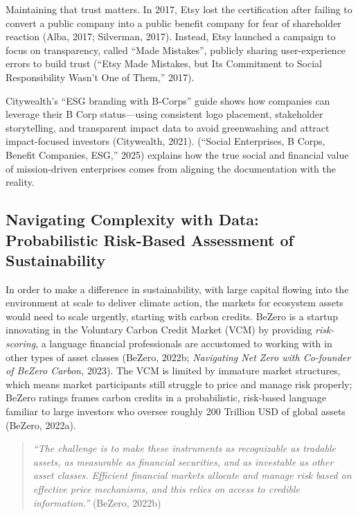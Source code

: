 \documentclass[
  12pt,
  letterpaper,
  DIV=11,
  numbers=noendperiod]{scrartcl}
\begin{document}
Maintaining that trust matters. In 2017, Etsy lost the certification
after failing to convert a public company into a public benefit company
for fear of shareholder reaction (Alba, 2017; Silverman, 2017). Instead,
Etsy launched a campaign to focus on transparency, called ``Made
Mistakes'', publicly sharing user-experience errors to build trust
({``Etsy Made Mistakes, but Its Commitment to Social Responsibility
Wasn't One of Them,''} 2017).

Citywealth's ``ESG branding with B-Corps'' guide shows how companies can
leverage their B Corp status---using consistent logo placement,
stakeholder storytelling, and transparent impact data to avoid
greenwashing and attract impact-focused investors (Citywealth, 2021).
({``Social {Enterprises}, {B Corps}, {Benefit Companies}, {ESG},''}
2025) explains how the true social and financial value of mission-driven
enterprises comes from aligning the documentation with the reality.

\subsection{Navigating Complexity with Data: Probabilistic Risk-Based
Assessment of
Sustainability}\label{navigating-complexity-with-data-probabilistic-risk-based-assessment-of-sustainability}

In order to make a difference in sustainability, with large capital
flowing into the environment at scale to deliver climate action, the
markets for ecosystem assets would need to scale urgently, starting with
carbon credits. BeZero is a startup innovating in the Voluntary Carbon
Credit Market (VCM) by providing \emph{risk-scoring}, a language
financial professionals are accustomed to working with in other types of
asset classes (BeZero, 2022b; \emph{Navigating {Net Zero} with
{Co-founder} of {BeZero Carbon},} 2023). The VCM is limited by immature
market structures, which means market participants still struggle to
price and manage risk properly; BeZero ratings frames carbon credits in
a probabilistic, risk-based language familiar to large investors who
oversee roughly 200 Trillion USD of global assets (BeZero, 2022a).

\begin{quote}
\emph{``The challenge is to make these instruments as recognizable as
tradable assets, as measurable as financial securities, and as
investable as other asset classes. Efficient financial markets allocate
and manage risk based on effective price mechanisms, and this relies on
access to credible information.''} (BeZero, 2022b)
\end{quote}
\end{document}
